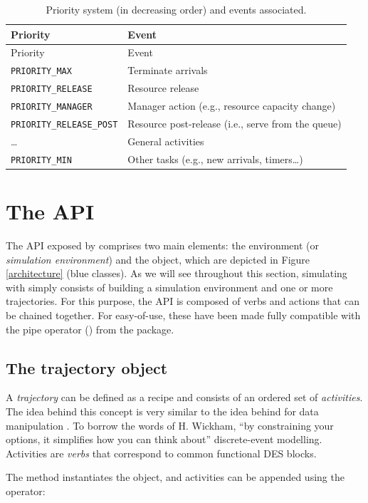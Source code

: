 \documentclass[
  nojss]{jss}
\begin{document}
\begin{longtable}[]{@{}ll@{}}
\caption{Priority system (in decreasing order) and events
associated.\label{priorities}}\tabularnewline
\toprule
Priority & Event\tabularnewline
\midrule
\endfirsthead
\toprule
Priority & Event\tabularnewline
\midrule
\endhead
\texttt{PRIORITY\_MAX} & Terminate arrivals\tabularnewline
\texttt{PRIORITY\_RELEASE} & Resource release\tabularnewline
\texttt{PRIORITY\_MANAGER} & Manager action (e.g., resource capacity
change)\tabularnewline
\texttt{PRIORITY\_RELEASE\_POST} & Resource post-release (i.e., serve
from the queue)\tabularnewline
\ldots{} & General activities\tabularnewline
\texttt{PRIORITY\_MIN} & Other tasks (e.g., new arrivals,
timers\ldots)\tabularnewline
\bottomrule
\end{longtable}

\section[The simmer API]{The  API}

The  API exposed by  comprises two main
elements: the  environment (or \emph{simulation
environment}) and the  object, which are depicted in
Figure \ref{architecture} (blue classes). As we will see throughout this
section, simulating with  simply consists of building a
simulation environment and one or more trajectories. For this purpose,
the API is composed of verbs and actions that can be chained together.
For easy-of-use, these have been made fully compatible with the pipe
operator (\code{\%>\%}) from the  package.

\hypertarget{the-trajectory-object}{%
\subsection{The trajectory object}\label{the-trajectory-object}}

A \emph{trajectory} can be defined as a recipe and consists of an
ordered set of \emph{activities}. The idea behind this concept is very
similar to the idea behind  for data manipulation
\citep{CRAN:dplyr}. To borrow the words of H. Wickham, ``by constraining
your options, it simplifies how you can think about'' discrete-event
modelling. Activities are \emph{verbs} that correspond to common
functional DES blocks.

The  method instantiates the object, and activities
can be appended using the \code{\%>\%} operator:
\end{document}
